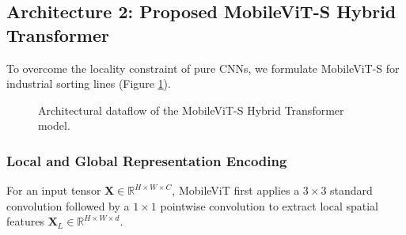 \documentclass[conference]{IEEEtran}
\begin{document}
\subsection{Architecture 2: Proposed MobileViT-S Hybrid Transformer}
To overcome the locality constraint of pure CNNs, we formulate MobileViT-S for industrial sorting lines (Figure \ref{fig:mobilevit_arch}).

\begin{figure}[htbp]
\centering
{}
\caption{Architectural dataflow of the MobileViT-S Hybrid Transformer model.}
\label{fig:mobilevit_arch}
\end{figure}

\subsubsection{Local and Global Representation Encoding}
For an input tensor $\mathbf{X} \in \mathbb{R}^{H \times W \times C}$, MobileViT first applies a $3 \times 3$ standard convolution followed by a $1 \times 1$ pointwise convolution to extract local spatial features $\mathbf{X}_L \in \mathbb{R}^{H \times W \times d}$.
\end{document}

